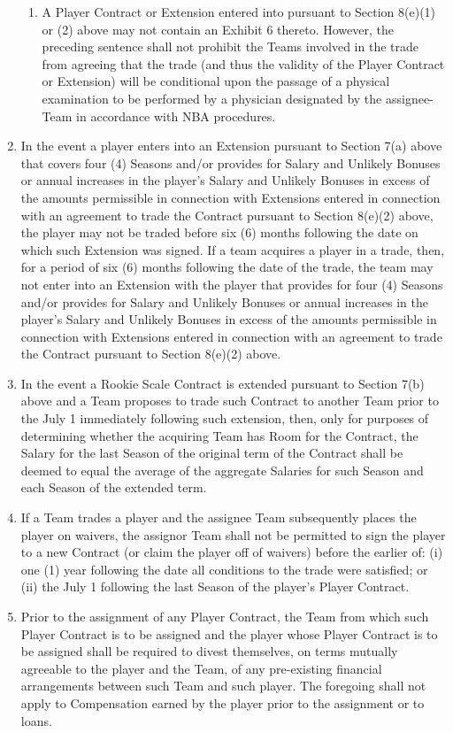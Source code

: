 \documentclass[
]{book}
\begin{document}
\begin{enumerate}
\begin{enumerate}
  \item
    A Player Contract or Extension entered into pursuant to Section 8(e)(1) or (2) above may not contain an Exhibit 6 thereto. However, the preceding sentence shall not prohibit the Teams involved in the trade from agreeing that the trade (and thus the validity of the Player Contract or Extension) will be conditional upon the passage of a physical examination to be performed by a physician designated by the assignee-Team in accordance with NBA procedures.
  \end{enumerate}
\item
  In the event a player enters into an Extension pursuant to Section 7(a) above that covers four (4) Seasons and/or provides for Salary and Unlikely Bonuses or annual increases in the player's Salary and Unlikely Bonuses in excess of the amounts permissible in connection with Extensions entered in connection with an agreement to trade the Contract pursuant to Section 8(e)(2) above, the player may not be traded before six (6) months following the date on which such Extension was signed. If a team acquires a player in a trade, then, for a period of six (6) months following the date of the trade, the team may not enter into an Extension with the player that provides for four (4) Seasons and/or provides for Salary and Unlikely Bonuses or annual increases in the player's Salary and Unlikely Bonuses in excess of the amounts permissible in connection with Extensions entered in connection with an agreement to trade the Contract pursuant to Section 8(e)(2) above.
\item
  In the event a Rookie Scale Contract is extended pursuant to Section 7(b) above and a Team proposes to trade such Contract to another Team prior to the July 1 immediately following such extension, then, only for purposes of determining whether the acquiring Team has Room for the Contract, the Salary for the last Season of the original term of the Contract shall be deemed to equal the average of the aggregate Salaries for such Season and each Season of the extended term.
\item
  If a Team trades a player and the assignee Team subsequently places the player on waivers, the assignor Team shall not be permitted to sign the player to a new Contract (or claim the player off of waivers) before the earlier of: (i) one (1) year following the date all conditions to the trade were satisfied; or (ii) the July 1 following the last Season of the player's Player Contract.
\item
  Prior to the assignment of any Player Contract, the Team from which such Player Contract is to be assigned and the player whose Player Contract is to be assigned shall be required to divest themselves, on terms mutually agreeable to the player and the Team, of any pre-existing financial arrangements between such Team and such player. The foregoing shall not apply to Compensation earned by the player prior to the assignment or to loans.

\end{enumerate}
\end{document}
